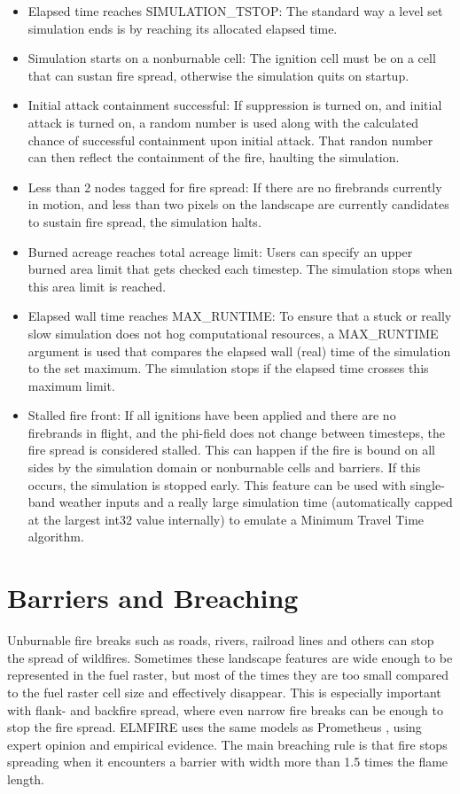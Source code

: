 \begin{itemize}
    \item Elapsed time reaches SIMULATION\_TSTOP: The standard way a level set simulation ends is by reaching its allocated elapsed time. 
    \item Simulation starts on a nonburnable cell: The ignition cell must be on a cell that can sustan fire spread, otherwise the simulation quits on startup.
    \item Initial attack containment successful: If suppression is turned on, and initial attack is turned on, a random number is used along with the calculated chance of successful containment upon initial attack. That randon number can then reflect the containment of the fire, haulting the simulation.
    \item Less than 2 nodes tagged for fire spread: If there are no firebrands currently in motion, and less than two pixels on the landscape are currently candidates to sustain fire spread, the simulation halts.
    \item Burned acreage reaches total acreage limit: Users can specify an upper burned area limit that gets checked each timestep. The simulation stops when this area limit is reached. 
    \item Elapsed wall time reaches MAX\_RUNTIME: To ensure that a stuck or really slow simulation does not hog computational resources, a MAX\_RUNTIME argument is used that compares the elapsed wall (real) time of the simulation to the set maximum. The simulation stops if the elapsed time crosses this maximum limit. 
    \item Stalled fire front: If all ignitions have been applied and there are no firebrands in flight, and the phi-field does not change between timesteps, the fire spread is considered stalled. This can happen if the fire is bound on all sides by the simulation domain or nonburnable cells and barriers. If this occurs, the simulation is stopped early. This feature can be used with single-band weather inputs and a really large simulation time (automatically capped at the largest int32 value internally) to emulate a Minimum Travel Time algorithm.
\end{itemize}

\section{Barriers and Breaching}
\label{barriers}

Unburnable fire breaks such as roads, rivers, railroad lines and others can stop the spread of wildfires. Sometimes these landscape features are wide enough to be represented in the fuel raster, but most of the times they are too small compared to the fuel raster cell size and effectively disappear. This is especially important with flank- and backfire spread, where even narrow fire breaks can be enough to stop the fire spread. ELMFIRE uses the same models as Prometheus \cite{tymstraDevelopmentStructurePrometheus2010}, using expert opinion and empirical evidence. The main breaching rule is that fire stops spreading when it encounters a barrier with width more than 1.5 times the flame length. 

